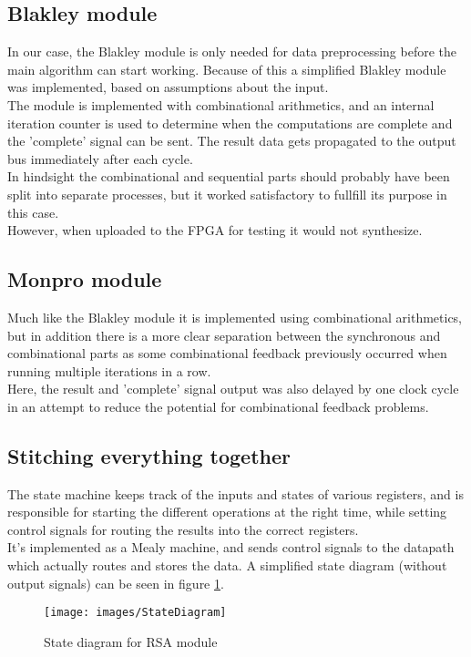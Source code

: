 \subsection{Blakley module}
In our case, the Blakley module is only needed for data preprocessing before the main algorithm can start working. Because of this a simplified Blakley module was implemented, based on assumptions about the input.\\
The module is implemented with combinational arithmetics, and an internal iteration counter is used to determine when the computations are complete and the 'complete' signal can be sent. The result data gets propagated to the output bus immediately after each cycle.\\
In hindsight the combinational and sequential parts should probably have been split into separate processes, but it worked satisfactory to fullfill its purpose in this case.\\
However, when uploaded to the FPGA for testing it would not synthesize.

\subsection{Monpro module}
Much like the Blakley module it is implemented using combinational arithmetics, but in addition there is a more clear separation between the synchronous and combinational parts as some combinational feedback previously occurred when running multiple iterations in a row.\\
Here, the result and 'complete' signal output was also delayed by one clock cycle in an attempt to reduce the potential for combinational feedback problems.

\subsection{Stitching everything together}
The state machine keeps track of the inputs and states of various registers, and is responsible for starting the different operations at the right time, while setting control signals for routing the results into the correct registers.\\
It's implemented as a Mealy machine\cite{mealy}, and sends control signals to the datapath which actually routes and stores the data. A simplified state diagram (without output signals) can be seen in figure \ref{fig:statediagramrsa}.

\begin{figure}[H]
\centering
\texttt{[image: images/StateDiagram]}
\caption{State diagram for RSA module}
\label{fig:statediagramrsa}
\end{figure}

